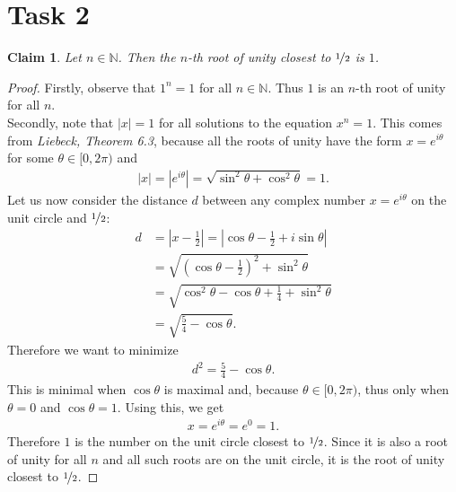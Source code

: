 \documentclass{article}
\newcommand{\N}{\mathbb{N}}
\newtheorem{claim}[section]{Claim}
\begin{document}
\section*{Task 2}
\begin{claim}
Let $n\in\N$. Then the $n$-th root of unity closest to $\nicefrac{1}{2}$ is $1$.
\end{claim}
\begin{proof}
  Firstly, observe that $1^n=1$ for all $n\in\N$. Thus $1$ is an $n$-th root of unity for all $n$.\\
  Secondly, note that $|x|=1$ for all solutions to the equation $x^n=1$. This comes from \emph{Liebeck, Theorem 6.3}, because all the roots of unity have the form $x=e^{i\theta}$ for some $\theta\in[0,2\pi)$ and
  \begin{align*}
    |x|=|e^{i\theta}|=\sqrt{\sin^2\theta+\cos^2\theta}=1.
  \end{align*}
  Let us now consider the distance $d$ between any complex number $x=e^{i\theta}$ on the unit circle and $\nicefrac{1}{2}$:
  \begin{align*}
    d&=\left|x-\frac{1}{2}\right|
    =\left|\cos\theta-\frac{1}{2}+i\sin\theta\right|\\
    &=\sqrt{\left(\cos\theta -\frac{1}{2}\right)^2+\sin^2\theta}\\
    &=\sqrt{\cos^2\theta-\cos\theta+\frac{1}{4}+\sin^2\theta}\\
    &=\sqrt{\frac{5}{4}-\cos\theta}.
  \end{align*}
  Therefore we want to minimize
  \begin{align*}
    d^2=\frac{5}{4}-\cos\theta.
  \end{align*}
  This is minimal when $\cos\theta$ is maximal and, because $\theta\in[0,2\pi)$, thus only when $\theta=0$ and $\cos \theta = 1$.
  Using this, we get
  \begin{align*}
    x=e^{i\theta}=e^{0}=1.
  \end{align*}
  Therefore $1$ is the number on the unit circle closest to $\nicefrac{1}{2}$. 
  Since it is also a root of unity for all $n$ and all such roots are on the unit circle, it is the root of unity closest to $\nicefrac{1}{2}$.
\end{proof}
\end{document}
